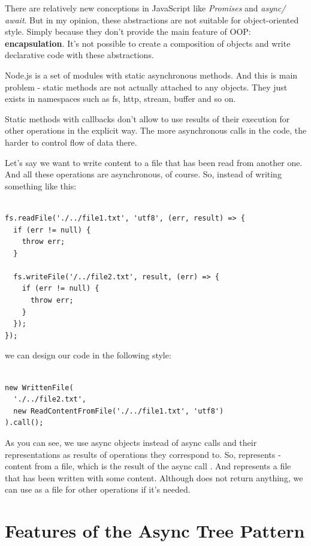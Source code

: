 \documentclass{article}
\newcommand{\cit}[1]{{\fontfamily{qcr}\selectfont{\textcolor{superdarkgray}{#1}}}}
\begin{document}
There are relatively new conceptions in JavaScript like \textit{Promises} and  \textit{async/ await}. But in my opinion, these abstractions are not suitable for object-oriented style. Simply because they don't provide the main feature of OOP: \textbf{encapsulation}. 
It's not possible to create a composition of objects and write declarative code with these abstractions.

Node.js is a set of modules with static asynchronous methods. And this is main problem - static methods are not actually attached to any objects. They just exists in namespaces such as fs, http, stream, buffer and so on.

Static methods with callbacks don't allow to use results of their execution for other operations in the explicit way. The more asynchronous calls in the code, the harder to control flow of data there.

Let's say we want to write content to a file that has been read from another one. And all these operations are asynchronous, of course. 
So, instead of writing something like this:

\begin{lstlisting}

fs.readFile('./../file1.txt', 'utf8', (err, result) => {
  if (err != null) {
    throw err;
  }
 
  fs.writeFile('/../file2.txt', result, (err) => {
    if (err != null) {
      throw err;
    }
  });
});

\end{lstlisting}

we can design our code in the following style:

\begin{lstlisting}

new WrittenFile(
  './../file2.txt',
  new ReadContentFromFile('./../file1.txt', 'utf8')
).call();

\end{lstlisting}

As you can see, we use async objects instead of async calls and their representations as results of operations they correspond to. So, \cit{ReadContentFromFile} represents \cit{string} - content from a file, which is the result of the async call \cit{fs.readFile}. And \cit{WrittenFile} represents a file that has been written with some content. Although \cit{fs.WriteFile} does not return anything, we can use \cit{WrittenFile} as a file for other operations if it's needed.

\section{Features of the Async Tree Pattern}
\end{document}
